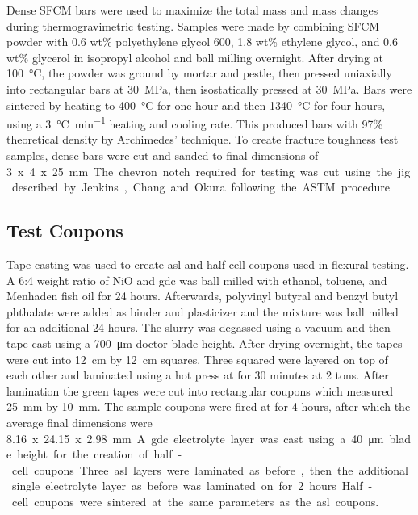         Dense SFCM bars were used to maximize the total mass and mass changes during thermogravimetric testing.
        Samples were made by combining SFCM powder with 0.6 wt\% polyethylene glycol 600, 1.8 wt\% ethylene glycol, and 0.6 wt\% glycerol in isopropyl alcohol and ball milling overnight.
        After drying at \SI{100}{\celsius}, the powder was ground by mortar and pestle, then pressed uniaxially into rectangular bars at \SI{30}{\mega\pascal}, then isostatically pressed at \SI{30}{\mega\pascal}.
        Bars were sintered by heating to \SI{400}{\celsius} for one hour and then \SI{1340}{\celsius} for four hours, using a \SI{3}{\celsius\per\minute} heating and cooling rate.
        This produced bars with 97\% theoretical density by Archimedes' technique.
        To create fracture toughness test samples, dense bars were cut and sanded to final dimensions of \SI{3} x \SI{4} x \SI{25}{mm}.
        The chevron notch required for testing was cut using the jig described by Jenkins, Chang and Okura following the ASTM procedure.\cite{Jenkins1988, ASTM2016a}

    \subsection{Test Coupons}
        Tape casting was used to create \gls{asl} and half-cell coupons used in flexural testing.
        A 6:4 weight ratio of NiO and \gls{gdc} was ball milled with ethanol, toluene, and Menhaden fish oil for 24 hours.
        Afterwards, polyvinyl butyral and benzyl butyl phthalate were added as binder and plasticizer and the mixture was ball milled for an additional 24 hours.
        The slurry was degassed using a vacuum and then tape cast using a \SI{700}{\micro\meter} doctor blade height.
        After drying overnight, the tapes were cut into \SI{12}{\centi\meter} by \SI{12}{\centi\meter} squares.
        Three squared were layered on top of each other and laminated using a hot press at  for 30 minutes at 2 tons.
        After lamination the green tapes were cut into rectangular coupons which measured \SI{25}{\milli\meter} by \SI{10}{\milli\meter}.
        The sample coupons were fired at  for 4 hours, after which the average final dimensions were \SI{8.16} x \SI{24.15} x \SI{2.98}{\milli\meter}.

        A \gls{gdc} electrolyte layer was cast using a \SI{40}{\micro\meter} blade height for the creation of half-cell coupons.
        Three \gls{asl} layers were laminated as before, then the additional single electrolyte layer as before was laminated on for 2 hours.
        Half-cell coupons were sintered at the same parameters as the \gls{asl} coupons.

